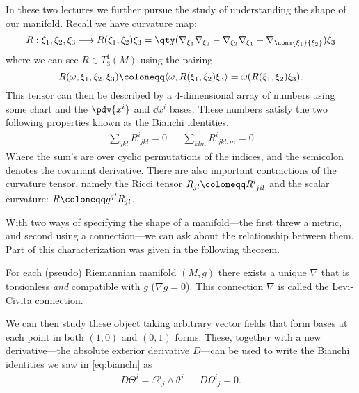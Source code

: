 \documentclass{homework}
\begin{document}
In these two lectures we further pursue the study of understanding the shape of our manifold.
Recall we have curvature map:
\begin{equation*}
	R: \xi_1, \xi_2, \xi_3 \longrightarrow R(\xi_1, \xi_2)\xi_3 = \qty(\nabla_{\xi_1}\nabla_{\xi_2} - \nabla_{\xi_2}\nabla_{\xi_1} - \nabla_{\comm{\xi_1}{\xi_2}})\xi_3
\end{equation*}
where we can see $R\in T^1_3(M)$ using the pairing
\begin{equation*}
	R(\omega, \xi_1, \xi_2, \xi_3) \defeq \langle\omega,R(\xi_1,\xi_2)\xi_3\rangle = \omega(R(\xi_1,\xi_2)\xi_3).
\end{equation*}
This tensor can then be described by a 4-dimensional array of numbers using some chart and the $\pdv{x^i}$ and $\dd{x^i}$ bases.
These numbers satisfy the two following properties known as the Bianchi identities.
\begin{align}\label{eq:bianchi}
	\sum_{jkl}R^i_{\phantom{i}jkl} = 0 &  & \sum_{klm}R^i_{\phantom{i}jkl;m} = 0
\end{align}
Where the sum's are over cyclic permutations of the indices, and the semicolon denotes the covariant derivative.
There are also important contractions of the curvature tensor, namely the Ricci tensor $R_{jl}\defeq R^i_{\phantom{i}jil}$ and the scalar curvature: $R\defeq g^{jl}R_{jl}$.

With two ways of specifying the shape of a manifold---the first threw a metric, and second using a connection---we can ask about the relationship between them.
Part of this characterization was given in the following theorem.
\begin{theorem}
	For each (pseudo) Riemannian manifold $(M, g)$ there exists a unique $\nabla$ that is torsionless \emph{and} compatible with $g$ ($\nabla g = 0$). This connection $\nabla$ is called the Levi-Civita connection.
\end{theorem}
We can then study these object taking arbitrary vector fields that form bases at each point in both $(1,0)$ and $(0,1)$ forms.
These, together with a new derivative---the absolute exterior derivative $D$---can be used to write the Bianchi identities we saw in \cref{eq:bianchi} as
\begin{align*}
	D\Theta^i = \Omega^i_{\phantom{i}j}\wedge \theta^j &  & D\Omega^i_{\phantom{i}j} = 0.
\end{align*}
\end{document}
